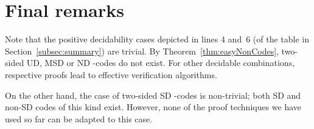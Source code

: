 \documentclass[final,nomarks]{dmtcs-episciences}
\begin{document}
\section{Final remarks}
\label{sec:final}

Note that the positive decidability cases depicted in lines 4
and~6 (of the table in Section~\ref{subsec:summary}) are trivial. By 
Theorem~\ref{thm:easyNonCodes}, two-sided
UD, MSD or ND -codes do not exist. For other decidable
combinations, respective proofs lead to effective verification
algorithms.

On the other hand, the case of two-sided SD -codes is
non-trivial; both SD and non-SD codes of this kind exist.
However, none of the proof techniques we have used so far can be
adapted to this case.




\end{document}
